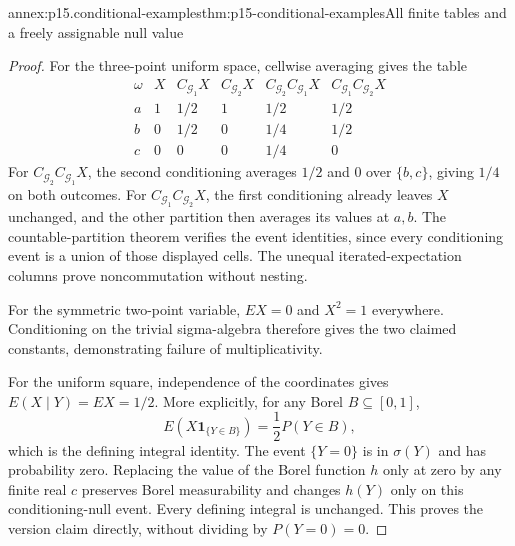\begin{annexitem}{annex:p15.conditional-examples}{thm:p15-conditional-examples}{All finite tables and a freely assignable null value}
\begin{proof}
For the three-point uniform space, cellwise averaging gives the table
\[
 \begin{array}{c|ccccc}
 \omega&X&C_{\mathcal G_1}X&C_{\mathcal G_2}X&
 C_{\mathcal G_2}C_{\mathcal G_1}X&C_{\mathcal G_1}C_{\mathcal G_2}X\\\hline
 a&1&1/2&1&1/2&1/2\\
 b&0&1/2&0&1/4&1/2\\
 c&0&0&0&1/4&0
 \end{array}
\]
For \(C_{\mathcal G_2}C_{\mathcal G_1}X\), the second conditioning
averages \(1/2\) and 0 over \(\{b,c\}\), giving \(1/4\) on both outcomes.
For \(C_{\mathcal G_1}C_{\mathcal G_2}X\), the first conditioning
already leaves \(X\) unchanged, and the other partition then averages
its values at \(a,b\).
The countable-partition theorem verifies the event identities, since
every conditioning event is a union of those displayed cells.
The unequal iterated-expectation columns prove noncommutation without nesting.

For the symmetric two-point variable, \(EX=0\) and \(X^2=1\)
everywhere. Conditioning on the trivial sigma-algebra therefore
gives the two claimed constants, demonstrating failure of
multiplicativity.

For the uniform square, independence of the coordinates gives
\(E(X\mid Y)=EX=1/2\). More explicitly, for any Borel \(B\subseteq[0,1]\),
\[
                  E(X\mathbf1_{\{Y\in B\}})
                         =\frac12P(Y\in B),
\]
which is the defining integral identity.
The event \(\{Y=0\}\) is in \(\sigma(Y)\) and has probability zero.
Replacing the value of the Borel function \(h\) only at zero by
any finite real \(c\) preserves Borel measurability and changes
\(h(Y)\) only on this conditioning-null event.
Every defining integral is unchanged. This proves the version
claim directly, without dividing by \(P(Y=0)=0\).
\end{proof}
\end{annexitem}
